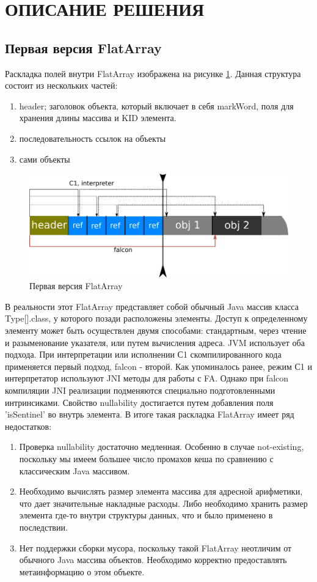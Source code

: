 \section*{ОПИСАНИЕ РЕШЕНИЯ} 
\addtocounter{section}{1}
\setcounter{subsection}{0}

\subsection{Первая версия FlatArray} 
Раскладка полей внутри FlatArray изображена на рисунке \ref{first-fa}.
Данная структура состоит из нескольких частей:
\begin{enumerate}
	\item header; заголовок объекта, который включает в себя markWord, поля для хранения длины массива и KID элемента.
	\item последовательность ссылок на объекты
	\item сами объекты
\end{enumerate}
\begin{figure}[h]
	\includegraphics[width=0.95\linewidth]{image/flatarray.png}
	\caption{Первая версия FlatArray}\label{first-fa}
\end{figure}
В реальности этот FlatArray представляет собой обычный Java массив класса Type[].class, у которого позади расположены элементы. Доступ к определенному элементу может быть осуществлен двумя способами: стандартным, через чтение и разыменование указателя, или путем вычисления адреса. 
JVM использует оба подхода. При интерпретации или исполнении С1 скомпилированного кода применяется первый подход, falcon - второй. 
Как упоминалось ранее, режим С1 и интерпретатор используют JNI методы для работы с FA. Однако при falcon компиляции JNI реализации подменяются специально подготовленными интринсиками. 
Свойство nullability достигается путем добавления поля 'isSentinel' во внутрь элемента. 
В итоге такая раскладка FlatArray имеет ряд недостатков:
\begin{enumerate}
	\item Проверка nullability достаточно медленная. Особенно в случае not-existing, поскольку мы имеем большее число промахов кеша по сравнению с классическим Java массивом.
	\item Необходимо вычислять размер элемента массива для адресной арифметики, что дает значительные накладные расходы. Либо необходимо хранить размер элемента где-то внутри структуры данных, что и было применено в последствии.
	\item Нет поддержки сборки мусора, поскольку такой FlatArray неотличим от обычного Java массива объектов. 
	Необходимо корректно предоставлять метаинформацию о этом объекте. 
\end{enumerate}


